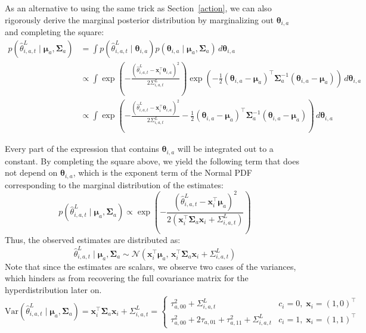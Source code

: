 \documentclass[letterpaper, 9pt]{extarticle}
\begin{document}
As an alternative to using the same trick as Section~\ref{action}, we can also rigorously derive the marginal posterior distribution by marginalizing out $\boldsymbol{\theta}_{i,a}$ and completing the square:
\begin{align*}
p\left(\hat{\theta}^L_{i,a,t}\mid \boldsymbol{\mu}_a,\boldsymbol{\Sigma}_a\right)
&=
\int
p\left(\hat{\theta}^L_{i,a,t}\mid \boldsymbol{\theta}_{i,a}\right)
p\left(\boldsymbol{\theta}_{i,a}\mid \boldsymbol{\mu}_a,\boldsymbol{\Sigma}_a\right)
\, d\boldsymbol{\theta}_{i,a} \\
&\propto
\int
\exp\left(
-\frac{
\left(
\hat{\theta}^L_{i,a,t}
-
\boldsymbol{x}_i^\top \boldsymbol{\theta}_{i,a}
\right)^2
}{
2\Sigma^L_{i,a,t}
}
\right)
\exp\left(
-\frac{1}{2}
(\boldsymbol{\theta}_{i,a}-\boldsymbol{\mu}_a)^\top
\boldsymbol{\Sigma}_a^{-1}
(\boldsymbol{\theta}_{i,a}-\boldsymbol{\mu}_a)
\right)
\, d\boldsymbol{\theta}_{i,a} \\
&\propto
\int
\exp\left(
-\frac{
\left(
\hat{\theta}^L_{i,a,t}
-
\boldsymbol{x}_i^\top \boldsymbol{\theta}_{i,a}
\right)^2
}{
2\Sigma^L_{i,a,t}
}
-\frac{1}{2}
(\boldsymbol{\theta}_{i,a}-\boldsymbol{\mu}_a)^\top
\boldsymbol{\Sigma}_a^{-1}
(\boldsymbol{\theta}_{i,a}-\boldsymbol{\mu}_a)
\right)
\, d\boldsymbol{\theta}_{i,a}
\end{align*}

Every part of the expression that contains $\boldsymbol{\theta}_{i,a}$ will be integrated out to a constant. By completing the square above, we yield the following term that does not depend on $\boldsymbol{\theta}_{i,a}$, which is the exponent term of the Normal PDF corresponding to the marginal distribution of the estimates:
$$
p\left(\hat{\theta}^L_{i,a,t}\mid \boldsymbol{\mu}_a,\boldsymbol{\Sigma}_a\right) \propto \exp\left(
-\frac{
\left(
\hat{\theta}^L_{i,a,t}
-
\boldsymbol{x}_i^\top \boldsymbol{\mu}_a
\right)^2
}{
2\left(
\boldsymbol{x}_i^\top \boldsymbol{\Sigma}_a \boldsymbol{x}_i
+
\Sigma^L_{i,a,t}
\right)
}
\right)
$$
Thus, the observed estimates are distributed as:
$$\hat{\theta}^{L}_{i,a,t}
\mid
\boldsymbol{\mu}_a,\boldsymbol{\Sigma}_a
\sim
\mathcal{N}\!\left(
\boldsymbol{x}_i^\top\boldsymbol{\mu}_a,\,
\boldsymbol{x}_i^\top\boldsymbol{\Sigma}_a\boldsymbol{x}_i+\Sigma_{i,a,t}^{L}
\right)$$ 
Note that since the estimates are scalars, we observe two cases of the variances, which hinders as from recovering the full covariance matrix for the hyperdistribution later on.
$$
\text{Var}(\hat{\theta}^L_{i,a,t} \mid \boldsymbol{\mu}_a, \boldsymbol{\Sigma}_a) = \boldsymbol{x}_i^\top\boldsymbol{\Sigma}_a\boldsymbol{x}_i+\Sigma_{i,a,t}^{L}=
\begin{cases}
\tau_{a,00}^2 + \Sigma^L_{i,a,t} & c_i = 0, \; \boldsymbol{x}_i = (1,0)^\top \\
\tau_{a,00}^2 + 2\tau_{a,01} + \tau_{a,11}^2 + \Sigma^L_{i,a,t} & c_i = 1, \; \boldsymbol{x}_i = (1,1)^\top
\end{cases}$$
\end{document}
